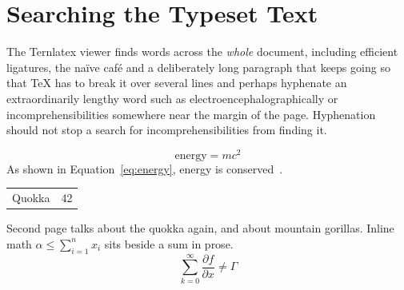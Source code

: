 \documentclass{article}
\newcommand{\tool}{Ternlatex}
\begin{document}
\section{Searching the Typeset Text}
The \tool{} viewer finds words across the \emph{whole} document, including
efficient ligatures, the na\"ive caf\'e and a deliberately long paragraph that keeps going so that
TeX has to break it over several lines and perhaps hyphenate an extraordinarily lengthy
word such as electroencephalographically or incomprehensibilities somewhere near the margin of the page.
Hyphenation should not stop a search for incomprehensibilities from finding it.



\begin{equation}
  \mathrm{energy} = m c^2 \label{eq:energy}
\end{equation}
As shown in Equation~\ref{eq:energy}, energy is conserved~\cite{einstein1905}.

\begin{tabular}{|l|r|}
Quokka & 42 \\
\end{tabular}

\newpage
Second page talks about the quokka again, and about mountain gorillas.
Inline math $\alpha \le \sum_{i=1}^{n} x_i$ sits beside a sum in prose.
\begin{equation}
  \sum_{k=0}^{\infty} \frac{\partial f}{\partial x} \neq \Gamma
\end{equation}
\end{document}
